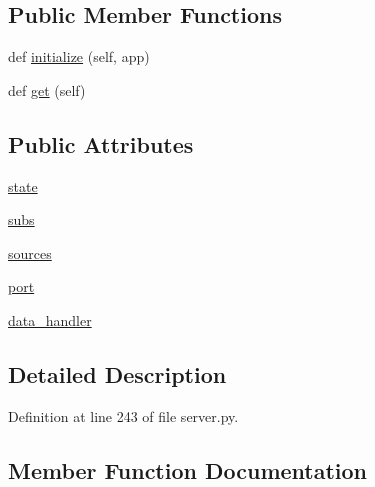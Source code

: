 \subsection*{Public Member Functions}
\begin{DoxyCompactItemize}
\item 
def \hyperlink{classparlai_1_1mturk_1_1webapp_1_1server_1_1TaskListHandler_a65f561e308d076bc129463480e83ffe5}{initialize} (self, app)
\item 
def \hyperlink{classparlai_1_1mturk_1_1webapp_1_1server_1_1TaskListHandler_ab7ff1ab2120e64b2f23aadb29d4eeac9}{get} (self)
\end{DoxyCompactItemize}
\subsection*{Public Attributes}
\begin{DoxyCompactItemize}
\item 
\hyperlink{classparlai_1_1mturk_1_1webapp_1_1server_1_1TaskListHandler_a130bda83b244ddc1ef7c461a10d90ce9}{state}
\item 
\hyperlink{classparlai_1_1mturk_1_1webapp_1_1server_1_1TaskListHandler_a9cbeab910d93da1b08334339c3a93bdf}{subs}
\item 
\hyperlink{classparlai_1_1mturk_1_1webapp_1_1server_1_1TaskListHandler_a7ebaf2e0e17b3caa6052a3ca975dbda9}{sources}
\item 
\hyperlink{classparlai_1_1mturk_1_1webapp_1_1server_1_1TaskListHandler_aeb14ed26510ea0b82bb22608b4073709}{port}
\item 
\hyperlink{classparlai_1_1mturk_1_1webapp_1_1server_1_1TaskListHandler_a2325ea777c0b0807a28d7bbbf9eb422b}{data\+\_\+handler}
\end{DoxyCompactItemize}


\subsection{Detailed Description}


Definition at line 243 of file server.\+py.



\subsection{Member Function Documentation}
\mbox{\label{classparlai_1_1mturk_1_1webapp_1_1server_1_1TaskListHandler_ab7ff1ab2120e64b2f23aadb29d4eeac9}} 
